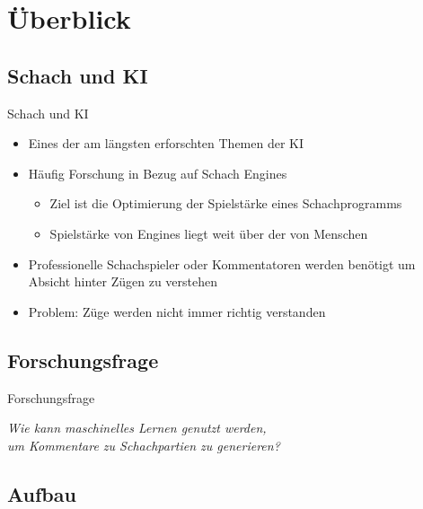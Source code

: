 \section{Überblick}

\subsection{Schach und KI}

\begin{frame}{Schach und KI}
\begin{itemize}
	\item Eines der am längsten erforschten Themen der KI
	\item Häufig Forschung in Bezug auf Schach Engines
	\begin{itemize}
		\item Ziel ist die Optimierung der Spielstärke eines Schachprogramms
		\item Spielstärke von Engines liegt weit über der von Menschen
	\end{itemize}
	\item Professionelle Schachspieler oder Kommentatoren werden benötigt um Absicht hinter Zügen zu verstehen
	\item Problem: Züge werden nicht immer richtig verstanden
\end{itemize}
\end{frame}

\subsection{Forschungsfrage}

\begin{frame}{Forschungsfrage}
\begin{center}
\begin{large}
\textit{Wie kann maschinelles Lernen genutzt werden,\\um Kommentare zu Schachpartien zu generieren?}
\end{large}
\end{center}
\end{frame}

\subsection{Aufbau}

